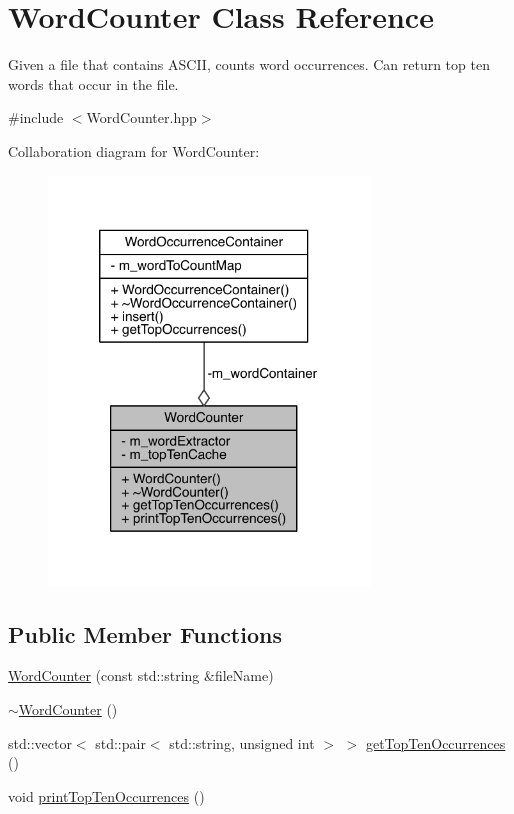 \hypertarget{class_word_counter}{}\section{Word\+Counter Class Reference}
\label{class_word_counter}


Given a file that contains A\+S\+C\+II, counts word occurrences. Can return top ten words that occur in the file.  




{\ttfamily \#include $<$Word\+Counter.\+hpp$>$}



Collaboration diagram for Word\+Counter\+:\nopagebreak
\begin{figure}[H]
\begin{center}
\leavevmode
\includegraphics[width=242pt]{class_word_counter__coll__graph}
\end{center}
\end{figure}
\subsection*{Public Member Functions}
\begin{DoxyCompactItemize}
\item 
\mbox{\hyperlink{class_word_counter_affea0f9dd574ac25eb447a161b4e9c22}{Word\+Counter}} (const std\+::string \&file\+Name)
\item 
\mbox{\hyperlink{class_word_counter_ad0703060b084d90e36bb7b506c7eff94}{$\sim$\+Word\+Counter}} ()
\item 
std\+::vector$<$ std\+::pair$<$ std\+::string, unsigned int $>$ $>$ \mbox{\hyperlink{class_word_counter_a0d81dc009206dbbdddfd0fc290252855}{get\+Top\+Ten\+Occurrences}} ()
\item 
void \mbox{\hyperlink{class_word_counter_a29d681756dec9d102141c6c8a136561d}{print\+Top\+Ten\+Occurrences}} ()
\end{DoxyCompactItemize}
